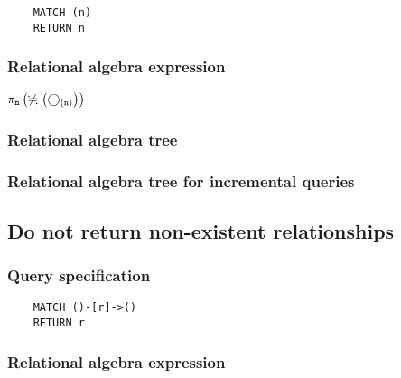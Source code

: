 	\begin{lstlisting}
	MATCH (n)
	RETURN n
	\end{lstlisting}


	\subsubsection*{Relational algebra expression}

	$\projection{\var{n}} \left(\alldifferent{} \left(\getvertices{n}{}\right)\right)$

	\subsubsection*{Relational algebra tree}


	\subsubsection*{Relational algebra tree for incremental queries}

	\subsection{Do not return non-existent relationships}

	\subsubsection*{Query specification}

	\begin{lstlisting}
	MATCH ()-[r]->()
	RETURN r
	\end{lstlisting}


	\subsubsection*{Relational algebra expression}

